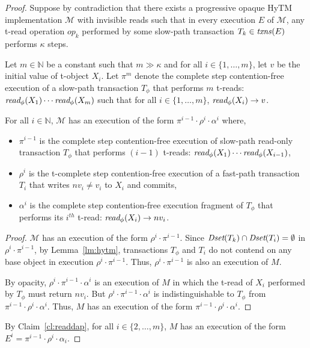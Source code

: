 \begin{proof}
Suppose by contradiction that there exists a progressive opaque HyTM implementation $\mathcal{M}$ with invisible reads such that in every execution $E$ of $\mathcal{M}$, any t-read operation $op_k$ performed by some slow-path transaction $T_k \in \ms{txns}(E)$
performs $\kappa$ steps.

Let $m \in \mathbb{N}$ be a constant such that $m \gg \kappa$ and for all $i\in \{1,\ldots , m\}$, let $v$ be the initial value of t-object $X_i$.
Let $\pi^{m}$ denote the complete step contention-free execution of a slow-path transaction
$T_{\phi}$ that performs ${m}$ t-reads: $\textit{read}_{\phi}(X_1)\cdots \textit{read}_{\phi}(X_{m})$
such that for all $i\in \{1,\ldots , m \}$, $\textit{read}_{\phi}(X_i) \rightarrow v$.
%
\begin{claim}
\label{cl:readdap}
For all $i\in \mathbb{N}$, $\mathcal{M}$ has an execution of the form $\pi^{i-1}\cdot \rho^i\cdot \alpha^i$ where,
%
\begin{itemize}
\item
$\pi^{i-1}$ is the complete step contention-free execution of slow-path read-only transaction $T_{\phi}$ that performs
$(i-1)$ t-reads: $\textit{read}_{\phi}(X_1)\cdots \textit{read}_{\phi}(X_{i-1})$,
\item
$\rho^i$ is the t-complete step contention-free execution of a fast-path transaction $T_{i}$
that writes $nv_i\neq v_i$ to $X_i$ and commits,
\item
$\alpha^i$ is the complete step contention-free execution fragment of $T_{\phi}$ that performs its $i^{th}$ t-read:
$\textit{read}_{\phi}(X_i) \rightarrow nv_i$.
\end{itemize}
%
\end{claim}
%
\begin{proof}
%
$\mathcal{M}$ has an execution of the form $\rho^i\cdot \pi^{i-1}$.
Since $\textit{Dset}(T_k) \cap \textit{Dset}(T_{i}) =\emptyset$ in $\rho^i\cdot \pi^{i-1}$,
by Lemma~\ref{lm:hytm}, transactions $T_{\phi}$ and $T_i$ do not contend
on any base object in execution $\rho^i\cdot \pi^{i-1}$.
Thus, $\rho^i\cdot \pi^{i-1}$ is also an execution of $M$.

By opacity, $\rho^i\cdot \pi^{i-1} \cdot \alpha^i$ is an execution
of $M$ in which the t-read of $X_i$ performed by $T_{\phi}$ must return $nv_i$.
But $\rho^i \cdot \pi^{i-1} \cdot \alpha^i$ is indistinguishable to $T_{\phi}$ from
$\pi^{i-1}\cdot \rho^i \cdot \alpha^i$.
Thus, $M$ has an execution of the form $\pi^{i-1}\cdot \rho^i \cdot \alpha^i$.
\end{proof}
%
By Claim~\ref{cl:readdap}, for all $i\in \{2,\ldots, m\}$, $M$ has an execution of the form 
$E^{i}=\pi^{i-1}\cdot \rho^i \cdot \alpha_i$.


\end{proof}
